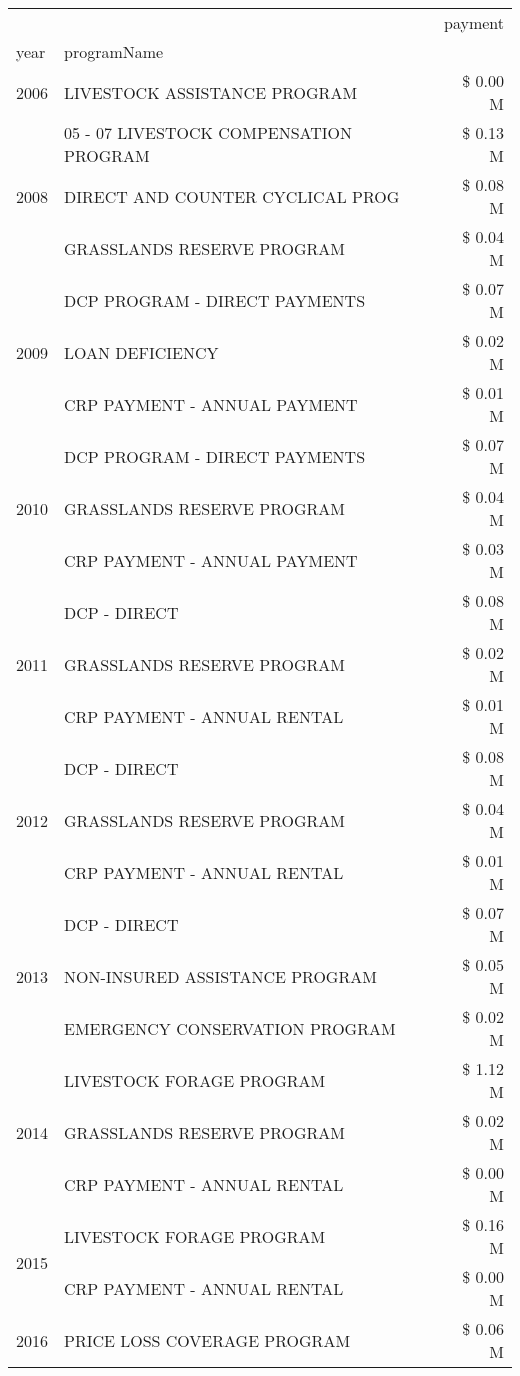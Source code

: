 \begin{tabular}{llr}
\toprule
 &  & payment \\
year & programName &  \\
\midrule
2006 & LIVESTOCK ASSISTANCE PROGRAM & \$ 0.00 M \\
\cline{1-3}
\multirow[t]{3}{*}{2008} & 05 - 07 LIVESTOCK COMPENSATION PROGRAM & \$ 0.13 M \\
 & DIRECT AND COUNTER CYCLICAL PROG & \$ 0.08 M \\
 & GRASSLANDS RESERVE PROGRAM & \$ 0.04 M \\
\cline{1-3}
\multirow[t]{3}{*}{2009} & DCP PROGRAM - DIRECT PAYMENTS & \$ 0.07 M \\
 & LOAN DEFICIENCY & \$ 0.02 M \\
 & CRP PAYMENT - ANNUAL PAYMENT & \$ 0.01 M \\
\cline{1-3}
\multirow[t]{3}{*}{2010} & DCP PROGRAM - DIRECT PAYMENTS & \$ 0.07 M \\
 & GRASSLANDS RESERVE PROGRAM & \$ 0.04 M \\
 & CRP PAYMENT - ANNUAL PAYMENT & \$ 0.03 M \\
\cline{1-3}
\multirow[t]{3}{*}{2011} & DCP - DIRECT & \$ 0.08 M \\
 & GRASSLANDS RESERVE PROGRAM & \$ 0.02 M \\
 & CRP PAYMENT - ANNUAL RENTAL & \$ 0.01 M \\
\cline{1-3}
\multirow[t]{3}{*}{2012} & DCP - DIRECT & \$ 0.08 M \\
 & GRASSLANDS RESERVE PROGRAM & \$ 0.04 M \\
 & CRP PAYMENT - ANNUAL RENTAL & \$ 0.01 M \\
\cline{1-3}
\multirow[t]{3}{*}{2013} & DCP - DIRECT & \$ 0.07 M \\
 & NON-INSURED ASSISTANCE PROGRAM & \$ 0.05 M \\
 & EMERGENCY CONSERVATION PROGRAM & \$ 0.02 M \\
\cline{1-3}
\multirow[t]{3}{*}{2014} & LIVESTOCK FORAGE PROGRAM & \$ 1.12 M \\
 & GRASSLANDS RESERVE PROGRAM & \$ 0.02 M \\
 & CRP PAYMENT - ANNUAL RENTAL & \$ 0.00 M \\
\cline{1-3}
\multirow[t]{2}{*}{2015} & LIVESTOCK FORAGE PROGRAM & \$ 0.16 M \\
 & CRP PAYMENT - ANNUAL RENTAL & \$ 0.00 M \\
\cline{1-3}
\multirow[t]{3}{*}{2016} & PRICE LOSS COVERAGE PROGRAM & \$ 0.06 M \\

\end{tabular}
